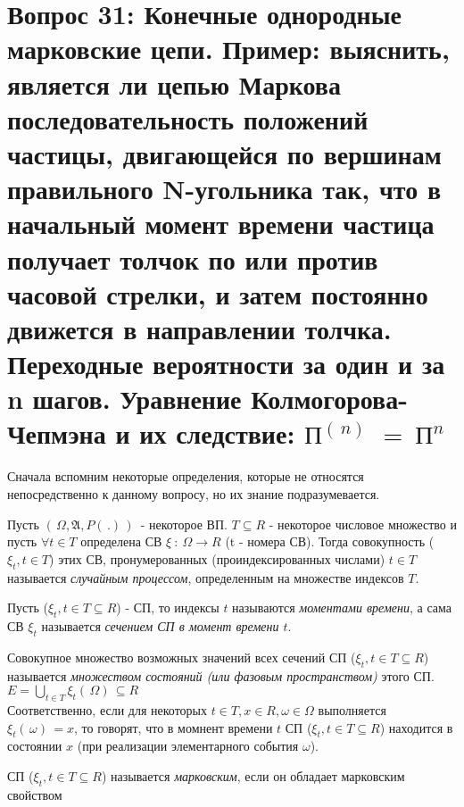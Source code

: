 \section{Вопрос 31: Конечные однородные марковские цепи.
Пример: выяснить, является ли цепью Маркова последовательность положений частицы, двигающейся по
вершинам правильного N-угольника так, что в начальный момент времени частица получает толчок по или против часовой стрелки,
и затем постоянно движется в направлении толчка.
Переходные вероятности за один и за n шагов. Уравнение Колмогорова-Чепмэна и их следствие: $\text{П}^{( \,n) \,} \ = \ \text{П}^{n}$
}

Сначала вспомним некоторые определения, которые не относятся непосредственно к данному вопросу, но их знание подразумевается.

\begin{defs}
  Пусть $( \,\Omega, \mathfrak{A}, P( \,.) \,) \,$ - некоторое ВП. $T \subseteq R$ - некоторое числовое множество
  и пусть $\forall t \in T$ определена СВ $\xi \ : \ \Omega \to R$ (t - номера СВ).
  Тогда совокупность ($\xi_t, t \in T$) этих СВ, пронумерованных (проиндексированных числами) $t \in T$ называется
  \textit{случайным процессом}, определенным на множестве индексов $T$.
\end{defs}

\begin{defs}[Сечение]
  Пусть ($\xi_t, t \in T \subseteq R$) - СП, то индексы $t$ называются \textit{моментами времени}, а сама СВ $\xi_t$ называется
  \textit{сечением СП в момент времени $t$}.
\end{defs}

\begin{defs}
  Совокупное множество возможных значений всех сечений СП ($\xi_t, t \in T \subseteq R$)
  называется \textit{множеством состояний (или фазовым пространством)} этого СП.
  $E = \bigcup\limits_{t \in T}\xi_t( \, \Omega) \, \subseteq R$\\
  Соответственно, если для некоторых $t \in T, x \in R, \omega \in \Omega$ выполняется
  $\xi_t( \,\omega) \,=x$, то говорят, что в момнент времени $t$ СП ($\xi_t, t \in T \subseteq R$)
  находится в состоянии $x$ (при реализации элементарного события $\omega$).
\end{defs}

\begin{defs}[Марковский СП]
  СП ($\xi_t, t \in T \subseteq R$) называется \textit{марковским}, если он обладает марковским свойством
\end{defs}

